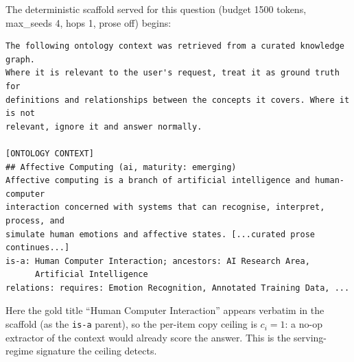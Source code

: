 \documentclass[10pt,twocolumn]{article}
\begin{document}
\noindent The deterministic scaffold served for this question (budget 1500 tokens, max\_seeds 4,
hops 1, prose off) begins:

{\footnotesize\begin{verbatim}
The following ontology context was retrieved from a curated knowledge graph.
Where it is relevant to the user's request, treat it as ground truth for
definitions and relationships between the concepts it covers. Where it is not
relevant, ignore it and answer normally.

[ONTOLOGY CONTEXT]
## Affective Computing (ai, maturity: emerging)
Affective computing is a branch of artificial intelligence and human-computer
interaction concerned with systems that can recognise, interpret, process, and
simulate human emotions and affective states. [...curated prose continues...]
is-a: Human Computer Interaction; ancestors: AI Research Area,
      Artificial Intelligence
relations: requires: Emotion Recognition, Annotated Training Data, ...
\end{verbatim}}

\noindent Here the gold title ``Human Computer Interaction'' appears verbatim in the scaffold
(as the \texttt{is-a} parent), so the per-item copy ceiling is $c_i=1$: a no-op extractor of the
context would already score the answer. This is the serving-regime signature the ceiling detects.

\printbibliography
\end{document}
